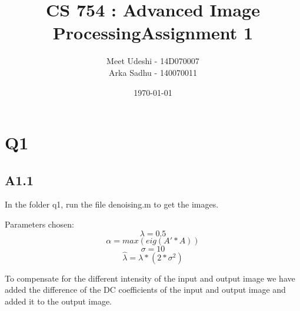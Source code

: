 \documentclass{article}
\title{CS 754 : Advanced Image ProcessingAssignment 1}
\author{Meet Udeshi - 14D070007\\
  Arka Sadhu - 140070011\\
}
\date{\today}
\begin{document}
\maketitle

\section*{Q1}
\subsection*{A1.1}
In the folder q1, run the file denoising.m to get the images.

Parameters chosen:
$$\lambda = 0.5$$
$$\alpha = max(eig(A'*A))$$
$$\sigma = 10$$
$$\hat{\lambda} = \lambda * (2 * \sigma^2)$$

To compensate for the different intensity of the input and output image we have added the difference of the DC coefficients of the input
and output image and added it to the output image.
\end{document}

